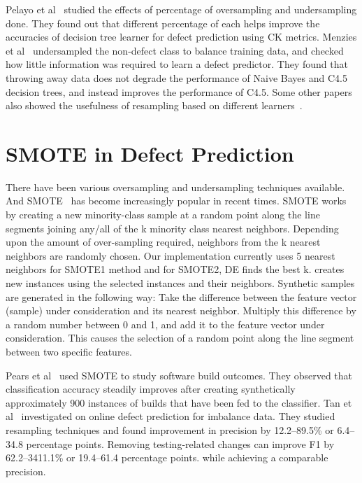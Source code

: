 \documentclass[sigconf]{acmart}
\theoremstyle{break}
\begin{document}
Pelayo et al~\cite{pelayo2007applying} studied the effects of percentage of oversampling and undersampling done. They found out that different percentage of each helps improve the accuracies of decision tree learner for defect prediction using CK metrics. Menzies et al~\cite{menzies2008implications} undersampled the non-defect class to balance training
data, and checked how little information was required to learn a defect predictor. They found that throwing away data does not degrade the performance of Naive Bayes and C4.5 decision trees, and instead improves the performance of C4.5. Some other papers also showed the usefulness of resampling based on different learners~\cite{pelayo2007applying, pelayo2012evaluating, riquelme2008finding}.

\section{SMOTE in Defect Prediction}
\label{sect:smote}

There have been various oversampling and undersampling techniques available. And SMOTE~\cite{chawla2002smote} has become increasingly popular in recent times. SMOTE works by creating a new minority-class sample at a random point along the line
segments joining any/all of the k minority class nearest neighbors. Depending upon the
amount of over-sampling required, neighbors from the k nearest neighbors are randomly
chosen. Our implementation currently uses 5 nearest neighbors for SMOTE1 method and for SMOTE2, DE finds the best k. creates new instances using the selected instances and their neighbors. Synthetic samples
are generated in the following way: Take the difference between the feature vector (sample)
under consideration and its nearest neighbor. Multiply this difference by a random number
between 0 and 1, and add it to the feature vector under consideration. This causes the
selection of a random point along the line segment between two specific features.

Pears et al~\cite{pears2014synthetic} used SMOTE to study software build outcomes. They observed
that classification accuracy steadily improves after creating synthetically approximately 900 instances of builds that have been fed to the classifier. Tan et al~\cite{tan2015online} investigated on online defect prediction for imbalance data. They studied resampling techniques and found improvement in precision by 12.2–89.5\% or 6.4–34.8 percentage points. Removing testing-related changes can improve F1 by 62.2–3411.1\% or 19.4–61.4 percentage points. while achieving a comparable precision.
\end{document}
